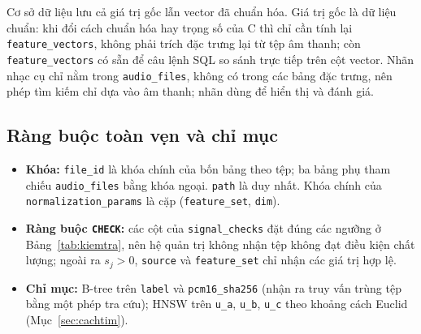 \documentclass[11pt,a4paper]{article}
\begin{document}
Cơ sở dữ liệu lưu cả giá trị gốc lẫn vector đã chuẩn hóa. Giá trị gốc là dữ liệu chuẩn: khi đổi cách chuẩn hóa hay trọng số của C thì chỉ cần tính lại \texttt{feature\_vectors}, không phải trích đặc trưng lại từ tệp âm thanh; còn \texttt{feature\_vectors} có sẵn để câu lệnh SQL so sánh trực tiếp trên cột vector. Nhãn nhạc cụ chỉ nằm trong \texttt{audio\_files}, không có trong các bảng đặc trưng, nên phép tìm kiếm chỉ dựa vào âm thanh; nhãn dùng để hiển thị và đánh giá.

\subsection{Ràng buộc toàn vẹn và chỉ mục}
\begin{itemize}
\item \textbf{Khóa:} \texttt{file\_id} là khóa chính của bốn bảng theo tệp; ba bảng phụ tham chiếu \texttt{audio\_files} bằng khóa ngoại. \texttt{path} là duy nhất. Khóa chính của \texttt{normalization\_params} là cặp (\texttt{feature\_set}, \texttt{dim}).
\item \textbf{Ràng buộc \texttt{CHECK}:} các cột của \texttt{signal\_checks} đặt đúng các ngưỡng ở Bảng~\ref{tab:kiemtra}, nên hệ quản trị không nhận tệp không đạt điều kiện chất lượng; ngoài ra $s_j>0$, \texttt{source} và \texttt{feature\_set} chỉ nhận các giá trị hợp lệ.
\item \textbf{Chỉ mục:} B-tree trên \texttt{label} và \texttt{pcm16\_sha256} (nhận ra truy vấn trùng tệp bằng một phép tra cứu); HNSW trên \texttt{u\_a}, \texttt{u\_b}, \texttt{u\_c} theo khoảng cách Euclid (Mục~\ref{sec:cachtim}).
\end{itemize}
\end{document}
